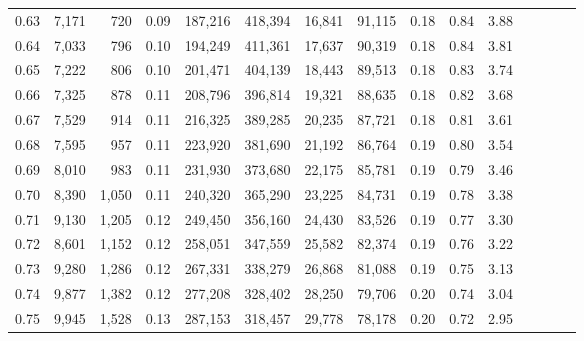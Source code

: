 \begin{tabular}{rrrcrrrrrrrrrrr}
0.63 &   7,171 &    720 &                                       0.09 &  187,216 &  418,394 &   16,841 &   91,115 &  0.18 &  0.84 &                         3.88 \\
0.64 &   7,033 &    796 &                                       0.10 &  194,249 &  411,361 &   17,637 &   90,319 &  0.18 &  0.84 &                         3.81 \\
0.65 &   7,222 &    806 &                                       0.10 &  201,471 &  404,139 &   18,443 &   89,513 &  0.18 &  0.83 &                         3.74 \\
0.66 &   7,325 &    878 &                                       0.11 &  208,796 &  396,814 &   19,321 &   88,635 &  0.18 &  0.82 &                         3.68 \\
0.67 &   7,529 &    914 &                                       0.11 &  216,325 &  389,285 &   20,235 &   87,721 &  0.18 &  0.81 &                         3.61 \\
0.68 &   7,595 &    957 &                                       0.11 &  223,920 &  381,690 &   21,192 &   86,764 &  0.19 &  0.80 &                         3.54 \\
0.69 &   8,010 &    983 &                                       0.11 &  231,930 &  373,680 &   22,175 &   85,781 &  0.19 &  0.79 &                         3.46 \\
0.70 &   8,390 &  1,050 &                                       0.11 &  240,320 &  365,290 &   23,225 &   84,731 &  0.19 &  0.78 &                         3.38 \\
0.71 &   9,130 &  1,205 &                                       0.12 &  249,450 &  356,160 &   24,430 &   83,526 &  0.19 &  0.77 &                         3.30 \\
0.72 &   8,601 &  1,152 &                                       0.12 &  258,051 &  347,559 &   25,582 &   82,374 &  0.19 &  0.76 &                         3.22 \\
0.73 &   9,280 &  1,286 &                                       0.12 &  267,331 &  338,279 &   26,868 &   81,088 &  0.19 &  0.75 &                         3.13 \\
0.74 &   9,877 &  1,382 &                                       0.12 &  277,208 &  328,402 &   28,250 &   79,706 &  0.20 &  0.74 &                         3.04 \\
0.75 &   9,945 &  1,528 &                                       0.13 &  287,153 &  318,457 &   29,778 &   78,178 &  0.20 &  0.72 &                         2.95 \\

\end{tabular}
